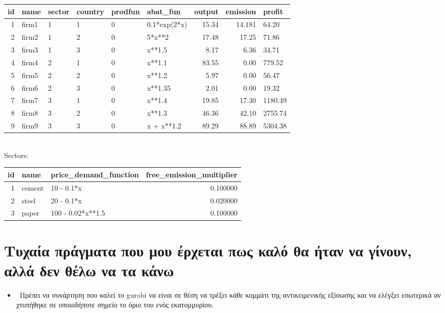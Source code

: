 \documentclass[a4paper,twoside,10pt]{article}
\begin{document}
\begin{tabular}{rlllllrrl}
	\toprule
	id & name & sector & country & prodfun & abat\_fun & output & emission & profit \\
	\midrule
	1 & firm1 & 1 & 1 & 0 & 0.1*exp(2*x) & 15.34 & 14.181 & 64.20\\
	2 & firm2 & 1 & 2 & 0 & 5*x**2 & 17.48 & 17.25 & 71.86\\
	3 & firm3 & 1 & 3 & 0 & x**1.5 & 8.17 & 6.36 & 34.71\\
	4 & firm4 & 2 & 1 & 0 & x**1.1 & 83.55 & 0.00 & 779.52\\
	5 & firm5 & 2 & 2 & 0 & x**1.2 & 5.97 & 0.00 & 56.47\\
	6 & firm6 & 2 & 3 & 0 & x**1.35 & 2.01 & 0.00 & 19.32\\
	7 & firm7 & 3 & 1 & 0 & x**1.4 & 19.85 & 17.30 & 1180.49\\
	8 & firm8 & 3 & 2 & 0 & x**1.3 & 46.36 & 42.10 & 2755.74\\
	9 & firm9 & 3 & 3 & 0 & x + x**1.2 & 89.29 & 88.89 & 5304.38\\
	\bottomrule
\end{tabular}\\
Sectors:
\begin{tabular}{rllr}
	\toprule
	  id & name & price\_demand\_function & free\_emission\_multiplier  \\
	\midrule
			1 & cement & 10 - 0.1*x & 0.100000 \\
			2 & steel & 20 - 0.1*x & 0.020000 \\
			3 & paper & 100 - 0.02*x**1.5 & 0.100000 \\
		\bottomrule
	\end{tabular}









\section{Τυχαία πράγματα που μου έρχεται πως καλό θα ήταν να γίνουν, αλλά δεν θέλω να τα κάνω}
\begin{itemize}[label*={}]
	\item \lbrack \ \rbrack Πρέπει να συνάρτηση που καλεί το gurobi να είναι σε θέση να τρέξει κάθε κομμάτι της αντικειμενικής εξίσωσης και να ελέγξει εσωτερικά αν χτυπήθηκε σε οποιοδήποτε σημείο το όριο του ενός εκατομμυρίου. 
\end{itemize}
\end{document}
